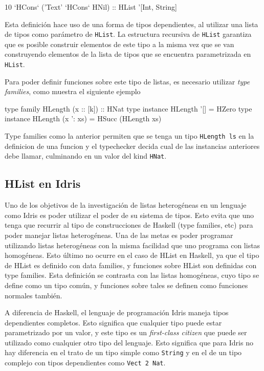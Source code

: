\begin{code}
10 `HCons` ('Text' `HCons` HNil) :: HList '[Int, String]
\end{code}

Esta definición hace uso de una forma de tipos dependientes, al utilizar una lista de tipos como parámetro de \texttt{HList}. La estructura recursiva de \texttt{HList} garantiza que es posible construir elementos de este tipo a la misma vez que se van construyendo elementos de la lista de tipos que se encuentra parametrizada en \texttt{HList}.

Para poder definir funciones sobre este tipo de listas, es necesario utilizar \textit{type families}, como muestra el siguiente ejemplo

\begin{code}
type family HLength (x :: [k]) :: HNat
type instance HLength '[] = HZero
type instance HLength (x ': xs) = HSucc (HLength xs)
\end{code}

Type families como la anterior permiten que se tenga un tipo \texttt{HLength ls} en la definicion de una funcion y el typechecker decida cual de las instancias anteriores debe llamar, culminando en un valor del kind \texttt{HNat}.

\subsection{HList en Idris}

Uno de los objetivos de la investigación de listas heterogéneas en un lenguaje como Idris es poder utilizar el poder de su sistema de tipos. Esto evita que uno tenga que recurrir al tipo de construcciones de Haskell (type families, etc) para poder manejar listas heterogéneas. Una de las metas es poder programar utilizando listas heterogéneas con la misma facilidad que uno programa con listas homogéneas.
Esto último no ocurre en el caso de HList en Haskell, ya que el tipo de HList es definido con data families, y funciones sobre HList son definidas con type families. Esta definición se contrasta con las listas homogéneas, cuyo tipo se define como un tipo común, y funciones sobre tales se definen como funciones normales también.

A diferencia de Haskell, el lenguaje de programación Idris maneja tipos dependientes completos. Esto significa que cualquier tipo puede estar parametrizado por un valor, y este tipo es un \textit{first-class citizen} que puede ser utilizado como cualquier otro tipo del lenguaje. Esto significa que para Idris no hay diferencia en el trato de un tipo simple como \texttt{String} y en el de un tipo complejo con tipos dependientes como \texttt{Vect 2 Nat}.

